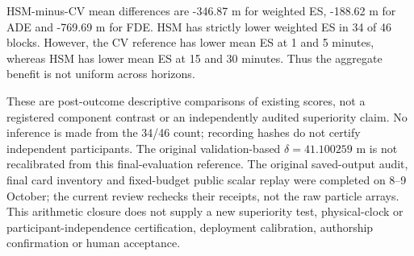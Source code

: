 HSM-minus-CV mean differences are -346.87 m for weighted ES, -188.62 m for ADE and -769.69 m for FDE. HSM has strictly lower weighted ES in 34 of 46 blocks. However, the CV reference has lower mean ES at 1 and 5 minutes, whereas HSM has lower mean ES at 15 and 30 minutes. Thus the aggregate benefit is not uniform across horizons.

These are post-outcome descriptive comparisons of existing scores, not a registered component contrast or an independently audited superiority claim. No inference is made from the 34/46 count; recording hashes do not certify independent participants. The original validation-based $\delta=41.100259$ m is not recalibrated from this final-evaluation reference. The original saved-output audit, final card inventory and fixed-budget public scalar replay were completed on 8--9 October; the current review rechecks their receipts, not the raw particle arrays. This arithmetic closure does not supply a new superiority test, physical-clock or participant-independence certification, deployment calibration, authorship confirmation or human acceptance.
\FloatBarrier
